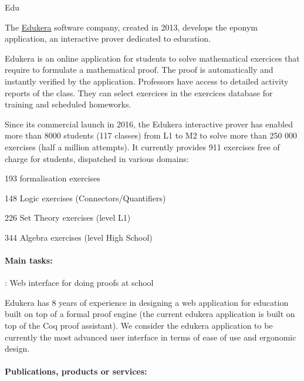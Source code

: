 \begin{sitedescription}{Edu}


The \hyperlink{https://www.edukera.com}{Edukera} software company, created in 2013,
develops the eponym application, an interactive prover dedicated to education.

Edukera is an online application for students to solve mathematical exercices that require to
formulate a mathematical proof. The proof is automatically and instantly verified by the application. Professors
have access to detailed activity reports of the class. They can select exercices in the exercices database
for training and scheduled homeworks.

Since its commercial launch in 2016, the Edukera interactive prover has enabled more than 8000 students
(117 classes) from L1 to M2 to solve more than 250 000 exercises (half a million attempts). It currently
provides 911 exercises free of charge for students, dispatched in various domains:
\begin{compactitem}
\item 193 formalisation exercises
\item 148 Logic exercises (Connectors/Quantifiers)
\item 226 Set Theory exercises (level L1)
\item 344 Algebra exercises (level High School)
\end{compactitem}

\paragraph*{Main tasks:}

\begin{compactitem}
\item {} : Web interface for doing proofs at school

Edukera has 8 years of experience in designing a web application for education built on top of a formal proof engine
(the current edukera application is built on top of the Coq proof assistant). We consider the edukera application to be
currently the most advanced user interface in terms of ease of use and ergonomic design.

\end{compactitem}

\paragraph*{Publications, products or services:}


\end{sitedescription}
